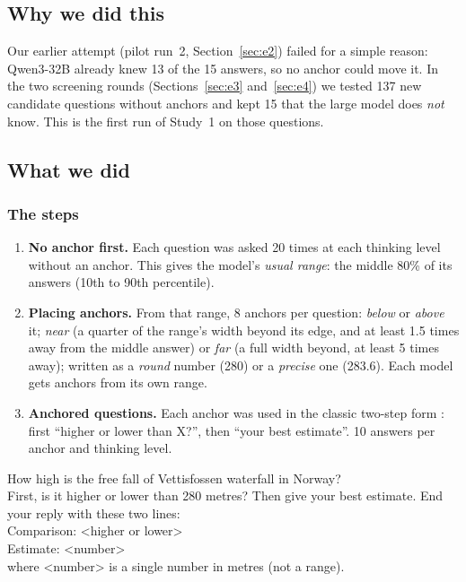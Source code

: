 \documentclass[11pt,a4paper]{article}
\begin{document}
\subsection{Why we did this}

Our earlier attempt (pilot run~2, Section~\ref{sec:e2}) failed for a simple reason: Qwen3-32B already knew 13 of the 15 answers, so no anchor could move it. In the two screening rounds (Sections~\ref{sec:e3} and~\ref{sec:e4}) we tested 137 new candidate questions without anchors and kept 15 that the large model does \emph{not} know. This is the first run of Study~1 on those questions.

\subsection{What we did}

\subsubsection{The steps}
\begin{enumerate}[leftmargin=*]
  \item \textbf{No anchor first.} Each question was asked 20 times at each thinking level without an anchor. This gives the model's \emph{usual range}: the middle 80\% of its answers (10th to 90th percentile).
  \item \textbf{Placing anchors.} From that range, 8 anchors per question: \emph{below} or \emph{above} it; \emph{near} (a quarter of the range's width beyond its edge, and at least 1.5 times away from the middle answer) or \emph{far} (a full width beyond, at least 5 times away); written as a \emph{round} number (280) or a \emph{precise} one (283.6). Each model gets anchors from its own range.
  \item \textbf{Anchored questions.} Each anchor was used in the classic two-step form \citep{jacowitz1995measures}: first \enquote{higher or lower than X?}, then \enquote{your best estimate}. 10 answers per anchor and thinking level.
\end{enumerate}

\begin{transcript}
How high is the free fall of Vettisfossen waterfall in Norway?\\[3pt]
First, is it higher or lower than 280 metres? Then give your best estimate. End your reply with these two lines:\\
Comparison: \textless higher or lower\textgreater\\
Estimate: \textless number\textgreater\\
where \textless number\textgreater{} is a single number in metres (not a range).
\end{transcript}
\end{document}
